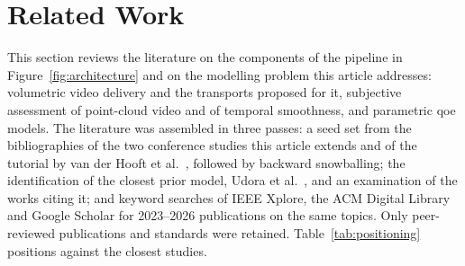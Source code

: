 \section{Related Work}
\label{sec:related}

This section reviews the literature on the components of the pipeline
in Figure~\ref{fig:architecture} and on the modelling problem this
article addresses: volumetric video delivery and the transports
proposed for it, subjective assessment of point-cloud video and of
temporal smoothness, and parametric \gls{qoe} models. The literature
was assembled in three passes: a seed set from the bibliographies of
the two conference studies this article extends and of the tutorial by
van der Hooft et al.~\cite{Immersivevideo}, followed by backward
snowballing; the identification of the closest prior model, Udora et
al.~\cite{qoeholographic,udora2026tmm}, and an examination of the works
citing it; and keyword searches of IEEE Xplore, the ACM Digital Library
and Google Scholar for 2023--2026 publications on the same topics.
Only peer-reviewed publications and standards were retained.
Table~\ref{tab:positioning} positions \crystal against the closest
studies.

